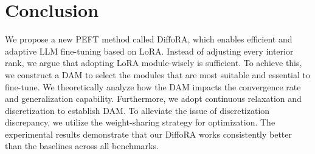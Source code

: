 \section{Conclusion}

We propose a new PEFT method called DiffoRA, which enables efficient and adaptive LLM fine-tuning based on LoRA. 
Instead of adjusting every interior rank, 
we argue that adopting LoRA module-wisely is sufficient. 
To achieve this, we construct a DAM to select the modules that are most suitable and essential to fine-tune. We theoretically analyze how the DAM impacts the convergence rate and generalization capability.
Furthermore, we adopt continuous relaxation and discretization to establish DAM.
To alleviate the issue of discretization discrepancy, we utilize the weight-sharing strategy for optimization. 
The experimental results demonstrate that our DiffoRA works consistently better than the baselines across all benchmarks. 